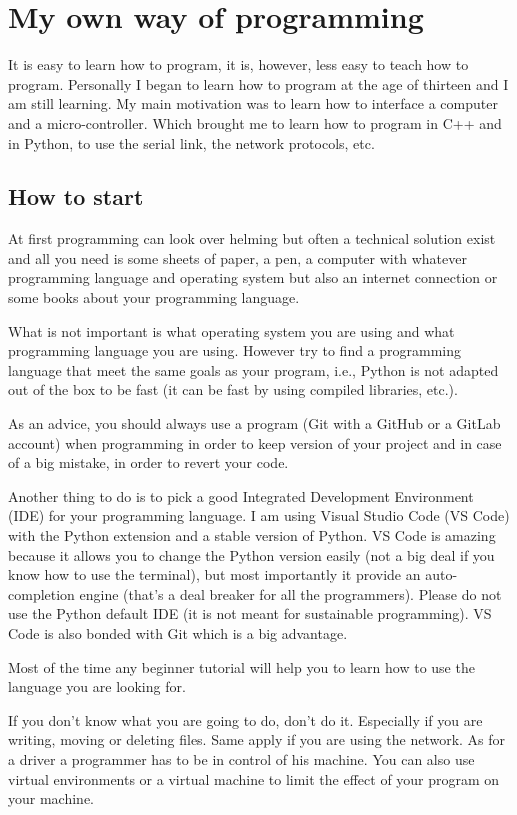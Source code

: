 \documentclass[english, 12 pt, openany, oneside]{book}
\begin{document}
\section{My own way of programming}
It is easy to learn how to program, it is, however, less easy to teach how to program. Personally I began to learn how to program at the age of thirteen and I am still learning. My main motivation was to learn how to interface a computer and a micro-controller. Which brought me to learn how to program in C++ and in Python, to use the serial link, the network protocols, etc.

\subsection{How to start}
At first programming can look over helming but often a technical solution exist and all you need is some sheets of paper, a pen, a computer with whatever programming language and operating system but also an internet connection or some books about your programming language.

What is not important is what operating system you are using and what programming language you are using. However try to find a programming language that meet the same goals as your program, i.e., Python is not adapted out of the box to be fast (it can be fast by using compiled libraries, etc.).

As an advice, you should always use a  program (Git with a GitHub or a GitLab account) when programming in order to keep version of your project and in case of a big mistake, in order to revert your code.

Another thing to do is to pick a good Integrated Development Environment (IDE) for your programming language. I am using Visual Studio Code (VS Code) with the Python extension and a stable version of Python. VS Code is amazing because it allows you to change the Python version easily (not a big deal if you know how to use the terminal), but most importantly it provide an auto-completion engine (that's a deal breaker for all the programmers). Please do not use the Python default IDE (it is not meant for sustainable programming). VS Code is also bonded with Git which is a big advantage.

Most of the time any beginner tutorial will help you to learn how to use the language you are looking for.

If you don't know what you are going to do, don't do it. Especially if you are writing, moving or deleting files. Same apply if you are using the network. As for a driver a programmer has to be in control of his machine. You can also use virtual environments or a virtual machine to limit the effect of your program on your machine.
\end{document}
